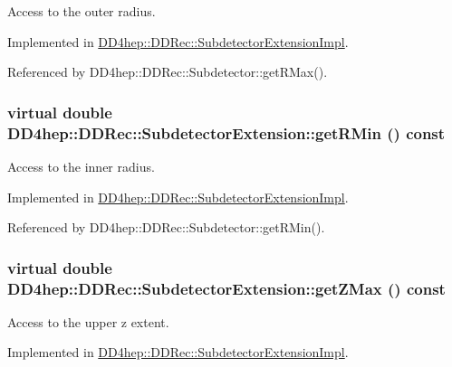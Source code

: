Access to the outer radius. 

Implemented in \hyperlink{class_d_d4hep_1_1_d_d_rec_1_1_subdetector_extension_impl_a2d3822620caa0a681d124f2219c6e451}{DD4hep::DDRec::SubdetectorExtensionImpl}.

Referenced by DD4hep::DDRec::Subdetector::getRMax().\hypertarget{class_d_d4hep_1_1_d_d_rec_1_1_subdetector_extension_a2de40b96e752aee9d68559657c8b7874}{
\subsubsection[{getRMin}]{\setlength{\rightskip}{0pt plus 5cm}virtual double DD4hep::DDRec::SubdetectorExtension::getRMin () const}}
\label{class_d_d4hep_1_1_d_d_rec_1_1_subdetector_extension_a2de40b96e752aee9d68559657c8b7874}


Access to the inner radius. 

Implemented in \hyperlink{class_d_d4hep_1_1_d_d_rec_1_1_subdetector_extension_impl_a9d9223f2ac1531aca259385ee8da198d}{DD4hep::DDRec::SubdetectorExtensionImpl}.

Referenced by DD4hep::DDRec::Subdetector::getRMin().\hypertarget{class_d_d4hep_1_1_d_d_rec_1_1_subdetector_extension_aea56290179f8271d6a2a3be1658d9b47}{
\subsubsection[{getZMax}]{\setlength{\rightskip}{0pt plus 5cm}virtual double DD4hep::DDRec::SubdetectorExtension::getZMax () const}}
\label{class_d_d4hep_1_1_d_d_rec_1_1_subdetector_extension_aea56290179f8271d6a2a3be1658d9b47}


Access to the upper z extent. 

Implemented in \hyperlink{class_d_d4hep_1_1_d_d_rec_1_1_subdetector_extension_impl_aba14e772e28306fd9692a11e1940c51b}{DD4hep::DDRec::SubdetectorExtensionImpl}.


